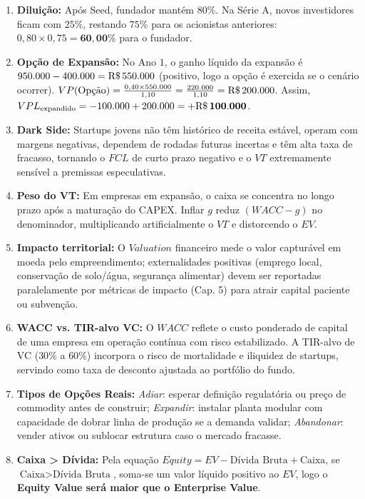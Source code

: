 \begin{boxGabarito}
\begin{enumerate}[leftmargin=1.5em, itemsep=4pt]
  $\%\text{Participação} = \frac{1.000.000}{3.703.703{,}70} \times 100\% = \mathbf{27{,}00\%}$.
  \item \textbf{Diluição:} Após Seed, fundador mantém $80\%$. Na Série A, novos investidores ficam com $25\%$, restando $75\%$ para os acionistas anteriores: $0{,}80 \times 0{,}75 = \mathbf{60{,}00\%}$ para o fundador.
  \item \textbf{Opção de Expansão:} No Ano $1$, o ganho líquido da expansão é $950.000 - 400.000 = \text{R\$\,}{550.000}$ (positivo, logo a opção é exercida se o cenário ocorrer). $VP(\text{Opção}) = \frac{0{,}40 \times 550.000}{1{,}10} = \frac{220.000}{1{,}10} = \text{R\$\,}{200.000}$. Assim, $VPL_{\text{expandido}} = -100.000 + 200.000 = \mathbf{+\text{R\$\,}{100.000}}$.
  \item \textbf{Dark Side:} Startups jovens não têm histórico de receita estável, operam com margens negativas, dependem de rodadas futuras incertas e têm alta taxa de fracasso, tornando o $FCL$ de curto prazo negativo e o $VT$ extremamente sensível a premissas especulativas.
  \item \textbf{Peso do VT:} Em empresas em expansão, o caixa se concentra no longo prazo após a maturação do CAPEX. Inflar $g$ reduz $(WACC - g)$ no denominador, multiplicando artificialmente o $VT$ e distorcendo o $EV$.
  \item \textbf{Impacto territorial:} O $Valuation$ financeiro mede o valor capturável em moeda pelo empreendimento; externalidades positivas (emprego local, conservação de solo/água, segurança alimentar) devem ser reportadas paralelamente por métricas de impacto (Cap. 5) para atrair capital paciente ou subvenção.
  \item \textbf{WACC vs. TIR-alvo VC:} O $WACC$ reflete o custo ponderado de capital de uma empresa em operação contínua com risco estabilizado. A TIR-alvo de VC ($30\%$ a $60\%$) incorpora o risco de mortalidade e iliquidez de startups, servindo como taxa de desconto ajustada ao portfólio do fundo.
  \item \textbf{Tipos de Opções Reais:} \textit{Adiar}: esperar definição regulatória ou preço de commodity antes de construir; \textit{Expandir}: instalar planta modular com capacidade de dobrar linha de produção se a demanda validar; \textit{Abandonar}: vender ativos ou sublocar estrutura caso o mercado fracasse.
  \item \textbf{Caixa > Dívida:} Pela equação $Equity = EV - \text{Dívida Bruta} + \text{Caixa}$, se $\text{Caixa} > \text{Dívida Bruta}$, soma-se um valor líquido positivo ao $EV$, logo o \textbf{Equity Value será maior que o Enterprise Value}.
\end{enumerate}
\end{boxGabarito}

